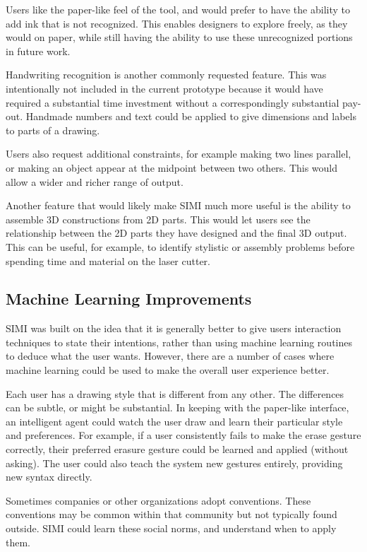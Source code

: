 Users like the paper-like feel of the tool, and would prefer to have
the ability to add ink that is not recognized. This enables designers
to explore freely, as they would on paper, while still having the
ability to use these unrecognized portions in future work.

Handwriting recognition is another commonly requested feature. This
was intentionally not included in the current prototype because it
would have required a substantial time investment without a
correspondingly substantial pay-out. Handmade numbers and text could be
applied to give dimensions and labels to parts of a drawing.

Users also request additional constraints, for example making two
lines parallel, or making an object appear at the midpoint between two
others. This would allow a wider and richer range of output.

Another feature that would likely make SIMI much more useful is the
ability to assemble 3D constructions from 2D parts. This would let
users see the relationship between the 2D parts they have designed and
the final 3D output. This can be useful, for example, to identify
stylistic or assembly problems before spending time and material on
the laser cutter.

\subsection{Machine Learning Improvements}

SIMI was built on the idea that it is generally better to give users
interaction techniques to state their intentions, rather than using
machine learning routines to deduce what the user wants. However,
there are a number of cases where machine learning could be used to
make the overall user experience better.

Each user has a drawing style that is different from any other. The
differences can be subtle, or might be substantial. In keeping with
the paper-like interface, an intelligent agent could watch the user
draw and learn their particular style and preferences. For example, if
a user consistently fails to make the erase gesture correctly, their
preferred erasure gesture could be learned and applied (without
asking). The user could also teach the system new gestures entirely,
providing new syntax directly.

Sometimes companies or other organizations adopt conventions. These
conventions may be common within that community but not typically
found outside. SIMI could learn these social norms, and understand
when to apply them.

